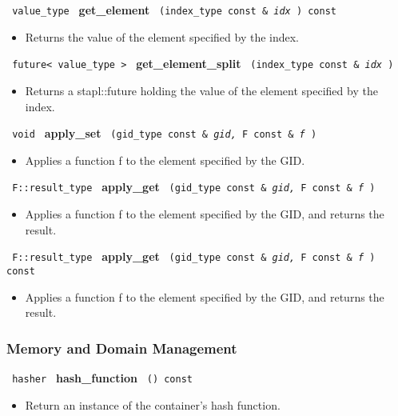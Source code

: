\noindent
\texttt{%
value\_type
}
\textbf{get\_element}%
\texttt{%
(index\_type const \&
\textit{idx}%
) const
}

\begin{itemize}
\item
Returns the value of the element specified by the index.
\end{itemize}
 
\noindent
\texttt{%
future< value\_type >
}
\textbf{get\_element\_split}%
\texttt{%
(index\_type const \&
\textit{idx}%
)
}

\begin{itemize}
\item
Returns a stapl::future holding the value of the element specified by the index.
\end{itemize}
 
\noindent
\texttt{%
void
}
\textbf{apply\_set}%
\texttt{%
(gid\_type const \&
\textit{gid,}%
F const \&
\textit{f}%
)
}

\begin{itemize}
\item
Applies a function f to the element specified by the GID.
\end{itemize}
 
\noindent
\texttt{%
F::result\_type
}
\textbf{apply\_get}%
\texttt{%
(gid\_type const \&
\textit{gid,}%
F const \&
\textit{f}%
)
}

\begin{itemize}
\item
Applies a function f to the element specified by the GID, and returns the result.
\end{itemize}
 
\noindent
\texttt{%
F::result\_type
}
\textbf{apply\_get}%
\texttt{%
(gid\_type const \&
\textit{gid,}%
F const \&
\textit{f}%
) const
}

\begin{itemize}
\item
Applies a function f to the element specified by the GID, and returns the result.
\end{itemize}
 
 
\subsubsection{Memory and Domain Management}

\noindent
\texttt{%
hasher 	
}
\textbf{hash\_function}%
\texttt{%
() const
}

\begin{itemize}
\item
Return an instance of the container's hash function.
\end{itemize}
 
